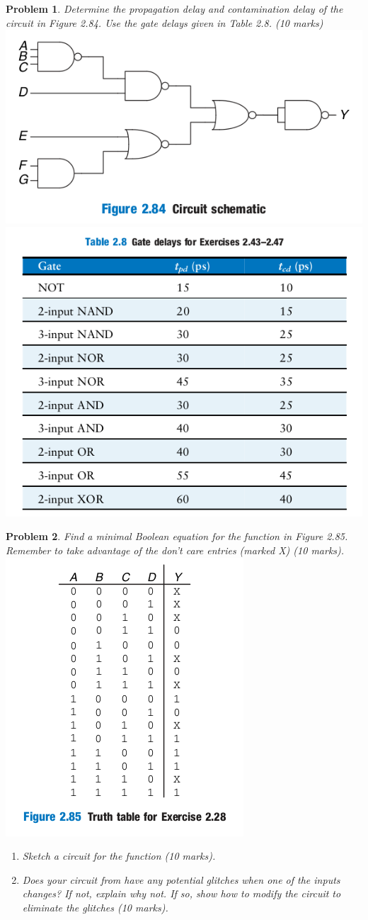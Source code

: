 \documentclass{article}
\newtheorem{prob}{Problem}
\begin{document}
\begin{prob}
  Determine the propagation delay and contamination delay of the
  circuit in Figure 2.84. Use the gate delays given in Table 2.8. (10 marks)\\
  \includegraphics[width=0.4\linewidth]{./fig/fig2.83-circuit.png} 
  \includegraphics[width=0.4\linewidth]{./fig/tab2.8-gate-delays.png}
\end{prob}

\begin{prob}
  Find a minimal Boolean equation for the function in Figure 2.85.
  Remember to take advantage of the don’t care entries (marked X) (10 marks).
  \includegraphics[width=0.3\linewidth]{./fig/fig2.85-truth-table.png}
  \begin{enumerate}
  \item Sketch a circuit for the function (10 marks).
  \item Does your circuit from have any potential glitches
    when one of the inputs changes? If not, explain why not. If so, show how to
    modify the circuit to eliminate the glitches (10 marks).
  \end{enumerate}
\end{prob}
\end{document}
